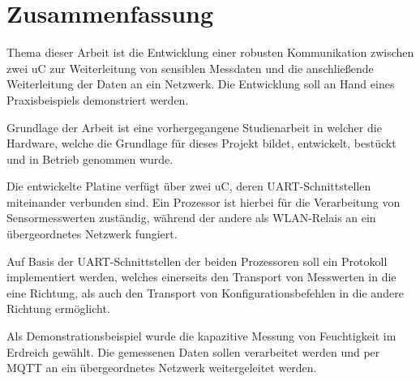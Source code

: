 \section*{Zusammenfassung}



Thema dieser Arbeit ist die Entwicklung einer robusten Kommunikation zwischen zwei \ac{uC} zur Weiterleitung von sensiblen Messdaten und 
die anschließende Weiterleitung der Daten an ein Netzwerk. Die Entwicklung soll an Hand eines Praxisbeispiels demonstriert werden.

\smallskip

Grundlage der Arbeit ist eine vorhergegangene Studienarbeit \citep{IoTGateway} in welcher die Hardware,
welche die Grundlage für dieses Projekt bildet, entwickelt, bestückt und in Betrieb genommen wurde.

Die entwickelte Platine verfügt über zwei \ac{uC}, deren \acs{UART}-Schnittstellen miteinander verbunden sind. Ein Prozessor ist hierbei
für die Verarbeitung von Sensormesswerten zuständig, während der andere als \acs{WLAN}-Relais an ein übergeordnetes Netzwerk fungiert.

\smallskip

Auf Basis der \acs{UART}-Schnittstellen der beiden Prozessoren soll ein Protokoll implementiert werden, welches einerseits den Transport
von Messwerten in die eine Richtung, als auch den Transport von Konfigurationsbefehlen in die andere Richtung ermöglicht. 

Als Demonstrationsbeispiel wurde die kapazitive Messung von Feuchtigkeit im Erdreich gewählt. Die gemessenen Daten sollen verarbeitet werden und
per \ac{MQTT} an ein übergeordnetes Netzwerk weitergeleitet werden.